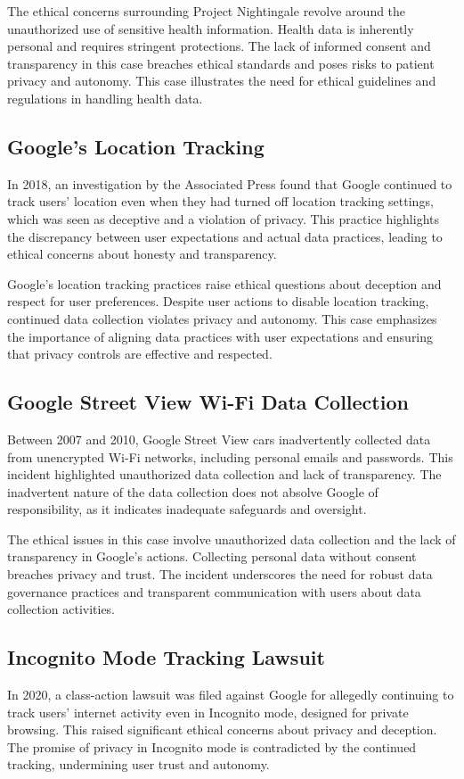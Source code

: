 The ethical concerns surrounding Project Nightingale revolve around the unauthorized use of sensitive health information.
Health data is inherently personal and requires stringent protections.
The lack of informed consent and transparency in this case breaches ethical standards and poses risks to patient privacy and autonomy.
This case illustrates the need for ethical guidelines and regulations in handling health data.

\subsection{Google’s Location Tracking}\label{subsec:googles-location-tracking}
In 2018, an investigation by the Associated Press found that Google continued to track users' location even when they had turned off location tracking settings, which was seen as deceptive and a violation of privacy.
This practice highlights the discrepancy between user expectations and actual data practices, leading to ethical concerns about honesty and transparency.

Google's location tracking practices raise ethical questions about deception and respect for user preferences.
Despite user actions to disable location tracking, continued data collection violates privacy and autonomy.
This case emphasizes the importance of aligning data practices with user expectations and ensuring that privacy controls are effective and respected.

\subsection{Google Street View Wi-Fi Data Collection}\label{subsec:google-street-view-wi-fi-data-collection}
Between 2007 and 2010, Google Street View cars inadvertently collected data from unencrypted Wi-Fi networks, including personal emails and passwords.
This incident highlighted unauthorized data collection and lack of transparency.
The inadvertent nature of the data collection does not absolve Google of responsibility, as it indicates inadequate safeguards and oversight.

The ethical issues in this case involve unauthorized data collection and the lack of transparency in Google's actions.
Collecting personal data without consent breaches privacy and trust.
The incident underscores the need for robust data governance practices and transparent communication with users about data collection activities.

\subsection{Incognito Mode Tracking Lawsuit}\label{subsec:incognito-mode-tracking-lawsuit}
In 2020, a class-action lawsuit was filed against Google for allegedly continuing to track users' internet activity even in Incognito mode, designed for private browsing.
This raised significant ethical concerns about privacy and deception.
The promise of privacy in Incognito mode is contradicted by the continued tracking, undermining user trust and autonomy.

